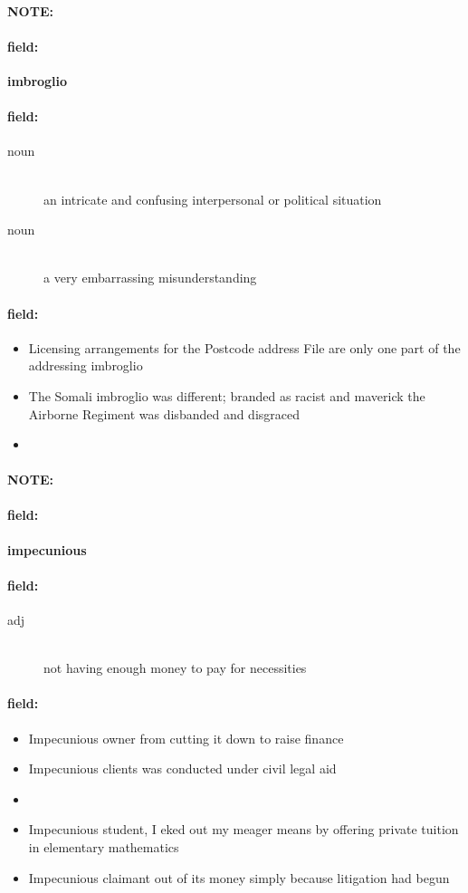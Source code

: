 \documentclass[12pt]{article}
\newenvironment{note}{\paragraph{NOTE:}}{}
\newenvironment{field}{\paragraph{field:}}{}
\begin{document}
\begin{note}
\begin{field}
\textbf{\large imbroglio}
\end{field}


\begin{field}
\begin{description}
\item[noun] \hfill \\ 
an intricate and confusing interpersonal or political situation

\item[noun] \hfill \\ 
a very embarrassing misunderstanding

\end{description}
\end{field}

\begin{field}
\begin{itemize}
\item Licensing arrangements for the Postcode address File are only one part of the addressing imbroglio
\item The Somali imbroglio was different; branded as racist and maverick the Airborne Regiment was disbanded and disgraced
\item 
\end{itemize}
\end{field}
\end{note}
\begin{note}
\begin{field}
\textbf{\large impecunious}
\end{field}


\begin{field}
\begin{description}
\item[adj] \hfill \\ 
not having enough money to pay for necessities

\end{description}
\end{field}

\begin{field}
\begin{itemize}
\item Impecunious owner from cutting it down to raise finance
\item Impecunious clients was conducted under civil legal aid
\item 
\item Impecunious student, I eked out my meager means by offering private tuition in elementary mathematics
\item Impecunious claimant out of its money simply because litigation had begun
\end{itemize}
\end{field}
\end{note}
\end{document}
